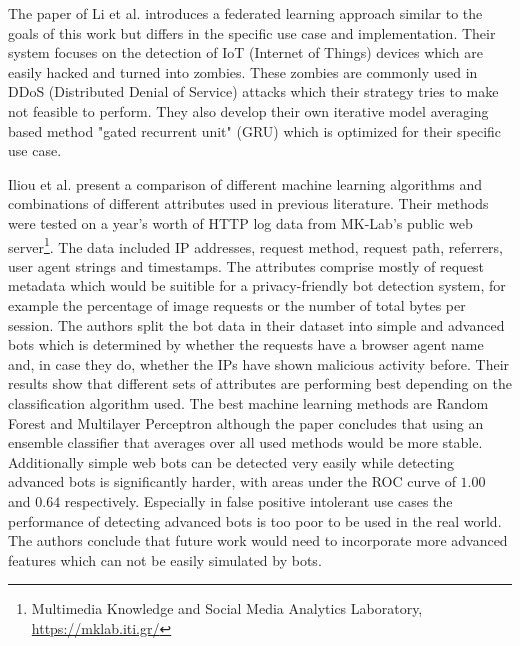 \documentclass[
    fontsize=12pt,
    headings=small,
    parskip=half,           %
    bibliography=totoc,
    numbers=noenddot,       %
    open=any,               %
    final                   %
]{scrreprt}
\begin{document}
The paper of Li et al. \cite{LiJi2021} introduces a federated learning approach similar to the goals of this work but differs in the specific use case and implementation. Their system focuses on the detection of IoT (Internet of Things) devices which are easily hacked and turned into zombies. These zombies are commonly used in DDoS (Distributed Denial of Service) attacks which their strategy tries to make not feasible to perform. They also develop their own iterative model averaging based method "gated recurrent unit" (GRU) which is optimized for their specific use case.

Iliou et al. \cite{10.1145/3339252.3339267} present a comparison of different machine learning algorithms and combinations of different attributes used in previous literature. Their methods were tested on a year's worth of HTTP log data from MK-Lab's public web server\footnote{Multimedia Knowledge and Social Media Analytics Laboratory, \url{https://mklab.iti.gr/}}. The data included IP addresses, request method, request path, referrers, user agent strings and timestamps. The attributes comprise mostly of request metadata which would be suitible for a privacy-friendly bot detection system, for example the percentage of image requests or the number of total bytes per session. The authors split the bot data in their dataset into simple and advanced bots which is determined by whether the requests have a browser agent name and, in case they do, whether the IPs have shown malicious activity before. Their results show that different sets of attributes are performing best depending on the classification algorithm used. The best machine learning methods are Random Forest and Multilayer Perceptron although the paper concludes that using an ensemble classifier that averages over all used methods would be more stable. Additionally simple web bots can be detected very easily while detecting advanced bots is significantly harder, with areas under the ROC curve of $1.00$ and $0.64$ respectively. Especially in false positive intolerant use cases the performance of detecting advanced bots is too poor to be used in the real world. The authors conclude that future work would need to incorporate more advanced features which can not be easily simulated by bots.
\end{document}
